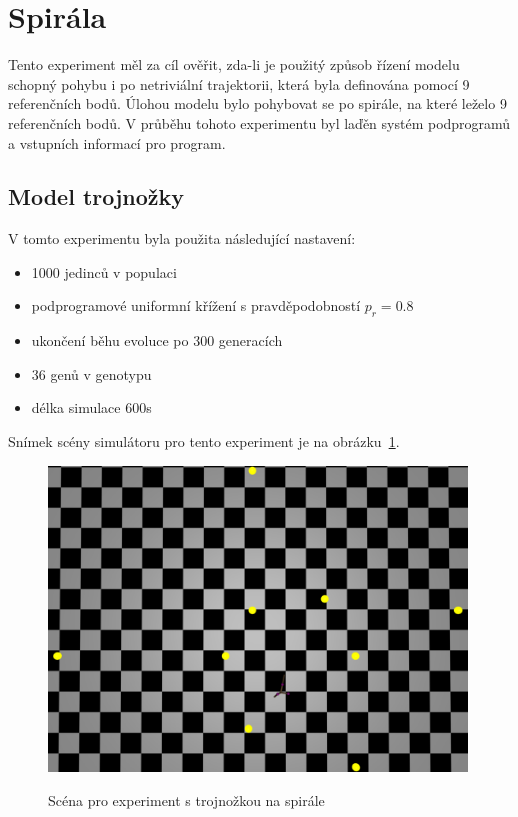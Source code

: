 

\section{Spirála}
Tento experiment měl za cíl ověřit, zda-li je použitý způsob řízení modelu schopný pohybu i po netriviální trajektorii, která byla definována pomocí 9 referenčních bodů.
Úlohou modelu bylo pohybovat se po spirále, na které leželo 9 referenčních bodů.
V průběhu tohoto experimentu byl laďěn systém podprogramů a vstupních informací pro program.

\subsection{Model trojnožky}
V tomto experimentu byla použita následující nastavení:
\begin{itemize}
    \item 1000 jedinců v populaci
    \item podprogramové uniformní křížení s pravděpodobností $p_r = 0.8$
    \item ukončení běhu evoluce po 300 generacích
    \item 36 genů v genotypu
    \item délka simulace 600s
\end{itemize}

Snímek scény simulátoru pro tento experiment je na obrázku~\ref{fig:trojnozka_spirala_zhora}.
\begin{figure}[h]
    \centering
    {\includegraphics[width=30em]{obrazky/trojnozka_spirala_zhora.png}}
    \caption{
    Scéna pro experiment s trojnožkou na spirále
    }
    \label{fig:trojnozka_spirala_zhora}
\end{figure}

